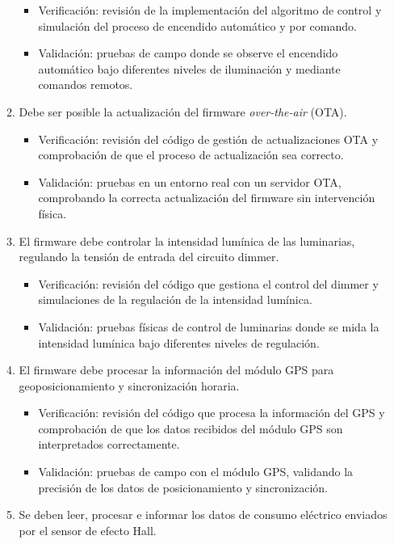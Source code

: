 \documentclass[
11pt, %
]{charter}
\begin{document}
\begin{enumerate}
\begin{enumerate}
				\begin{itemize}
				\item Verificación: revisión de la implementación del algoritmo de control y simulación del proceso de encendido automático y por comando.
				\item Validación: pruebas de campo donde se observe el encendido automático bajo diferentes niveles de iluminación y mediante comandos remotos.
				\end{itemize}
			\item Debe ser posible la actualización del firmware \textit{over-the-air} (OTA).
				\begin{itemize}
				\item Verificación: revisión del código de gestión de actualizaciones OTA y comprobación de que el proceso de actualización sea correcto.
				\item Validación: pruebas en un entorno real con un servidor OTA, comprobando la correcta actualización del firmware sin intervención física.
				\end{itemize}
			\item El firmware debe controlar la intensidad lumínica de las luminarias, regulando la tensión de entrada del circuito dimmer.
				\begin{itemize}
				\item Verificación: revisión del código que gestiona el control del dimmer y simulaciones de la regulación de la intensidad lumínica.
				\item Validación: pruebas físicas de control de luminarias donde se mida la intensidad lumínica bajo diferentes niveles de regulación.
				\end{itemize}
			\item El firmware debe procesar la información del módulo GPS para geoposicionamiento y sincronización horaria.
				\begin{itemize}
				\item Verificación: revisión del código que procesa la información del GPS y comprobación de que los datos recibidos del módulo GPS son interpretados correctamente.
				\item Validación: pruebas de campo con el módulo GPS, validando la precisión de los datos de posicionamiento y sincronización.
				\end{itemize}
			\item Se deben leer, procesar e informar los datos de consumo eléctrico enviados por el sensor de efecto Hall.
				\begin{itemize}

\end{itemize}
\end{enumerate}
\end{enumerate}
\end{document}
